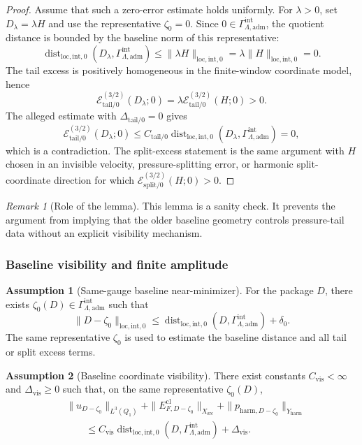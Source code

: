 \documentclass[11pt]{article}
\numberwithin{equation}{section}
\theoremstyle{definition}
\newtheorem{assumption}[assumption]{Assumption}
\theoremstyle{remark}
\newtheorem{remark}[remark]{Remark}
\newcommand{\loc}{\mathrm{loc}}
\newcommand{\intg}{\mathrm{int}}
\newcommand{\tail}{\mathrm{tail}}
\newcommand{\spl}{\mathrm{split}}
\newcommand{\adm}{\mathrm{adm}}
\newcommand{\harm}{\mathrm{harm}}
\newcommand{\src}{\mathrm{src}}
\newcommand{\cl}{\mathrm{cl}}
\newcommand{\Dist}{\operatorname{dist}}
\newcommand{\calE}{\mathcal E}
\newcommand{\Gammaadm}{\Gamma^{\intg}_{\Lambda,\adm}}
\begin{document}
\begin{proof}
Assume that such a zero-error estimate holds uniformly.  For \(\lambda>0\),
set \(D_\lambda=\lambda H\) and use the representative \(\zeta_0=0\).
Since \(0\in\Gammaadm\), the quotient distance is bounded by the baseline norm of
this representative:
\[
    \Dist_{\loc,\intg,0}(D_\lambda,\Gammaadm)
    \le
    \|\lambda H\|_{\loc,\intg,0}
    =
    \lambda\|H\|_{\loc,\intg,0}
    =
    0.
\]
The tail excess is positively homogeneous in the finite-window coordinate
model, hence
\[
    \calE_{\tail/0}^{(3/2)}(D_\lambda;0)
    =
    \lambda\calE_{\tail/0}^{(3/2)}(H;0)
    >
    0.
\]
The alleged estimate with \(\Delta_{\tail/0}=0\) gives
\[
    \calE_{\tail/0}^{(3/2)}(D_\lambda;0)
    \le
    C_{\tail/0}\Dist_{\loc,\intg,0}(D_\lambda,\Gammaadm)
    =
    0,
\]
which is a contradiction.  The split-excess statement is the same argument
with \(H\) chosen in an invisible velocity, pressure-splitting error, or
harmonic split-coordinate direction for which
\(\calE_{\spl/0}^{(3/2)}(H;0)>0\).
\end{proof}

\begin{remark}[Role of the lemma]
This lemma is a sanity check.  It prevents the argument from implying that
the older baseline geometry controls pressure-tail data without an explicit
visibility mechanism.
\end{remark}

\subsubsection{Baseline visibility and finite amplitude}
\label{sec:visibility}

\begin{assumption}[Same-gauge baseline near-minimizer]
\label{ass:same-gauge-baseline-minimizer}
For the package \(D\), there exists
\(\zeta_0(D)\in\Gammaadm\) such that
\[
    \|D-\zeta_0\|_{\loc,\intg,0}
    \le
    \Dist_{\loc,\intg,0}(D,\Gammaadm)
    +
    \delta_0.
\]
The same representative \(\zeta_0\) is used to estimate the baseline
distance and all tail or split excess terms.
\end{assumption}

\begin{assumption}[Baseline coordinate visibility]
\label{ass:baseline-coordinate-visibility}
There exist constants \(C_{\mathrm{vis}}<\infty\) and
\(\Delta_{\mathrm{vis}}\ge0\) such that, on the same representative
\(\zeta_0(D)\),
\[
\begin{aligned}
    &\|u_{D-\zeta_0}\|_{L^3(Q_1)}
    +
    \|E^{\cl}_{F,D-\zeta_0}\|_{X_{\src}}
    +
    \|p_{\harm,D-\zeta_0}\|_{Y_{\harm}}
\\
    &\qquad\le
    C_{\mathrm{vis}}
    \Dist_{\loc,\intg,0}(D,\Gammaadm)
    +
    \Delta_{\mathrm{vis}}.
\end{aligned}
\]
\end{assumption}
\end{document}
